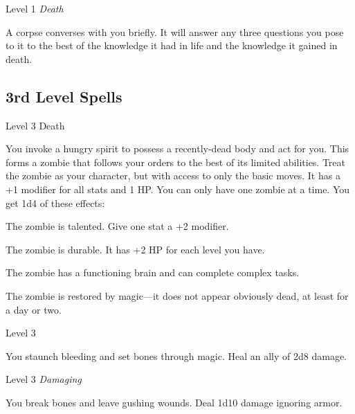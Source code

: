        
\startSpellName
          	Level 1	{\em Death} 
\stopSpellName
       

A corpse converses with you briefly. It will answer any three questions you pose to it to the best of the knowledge it had in life and the knowledge it gained in death.

     

     

       
\subsection{3rd Level Spells}     
       
\startSpellName
          	Level 3	Death
\stopSpellName
       

You invoke a hungry spirit to possess a recently-dead body and act for you. This forms a zombie that follows your orders to the best of its limited abilities. Treat the zombie as your character, but with access to only the basic moves. It has a +1 modifier for all stats and 1 HP. You can only have one zombie at a time. You get 1d4 of these effects:

       
\startitemize[1,packed]
         
\item The zombie is talented. Give one stat a +2 modifier.

         
\item The zombie is durable. It has +2 HP for each level you have.

         
\item The zombie has a functioning brain and can complete complex tasks.

         
\item The zombie is restored by magic—it does not appear obviously dead, at least for a day or two.

       
\stopitemize
       
\startSpellName
          	Level 3
\stopSpellName
       

You staunch bleeding and set bones through magic. Heal an ally of 2d8 damage.

       
\startSpellName
          	Level 3	{\em Damaging} 
\stopSpellName
       

You break bones and leave gushing wounds. Deal 1d10 damage ignoring armor.

